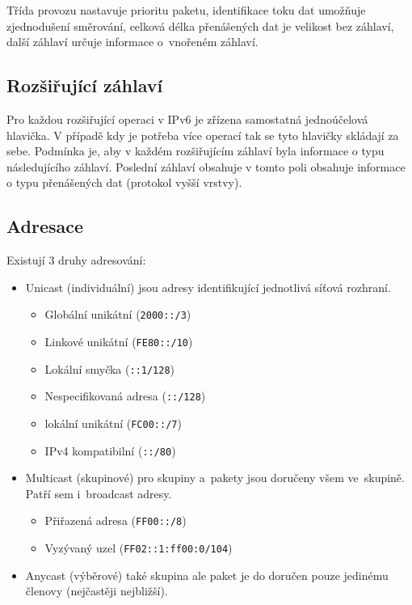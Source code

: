 Třída provozu nastavuje prioritu paketu, identifikace toku dat umožňuje zjednodušení směrování, celková délka přenášených dat je velikost bez záhlaví, další záhlaví určuje informace o~vnořeném záhlaví.

\subsection{Rozšiřující záhlaví}

Pro každou rozšiřující operaci v IPv6 je zřízena samostatná jednoúčelová hlavička.
V případě kdy je potřeba více operací tak se tyto hlavičky skládají za sebe. Podmínka je, aby v každém rozšiřujícím záhlaví byla informace o typu následujícího záhlaví.
Poslední záhlaví obsahuje v tomto poli obsahuje informace o typu přenášených dat (protokol vyšší vrstvy).

\subsection{Adresace}

Existují 3 druhy adresování:
\begin{itemize}[noitemsep]
    \item Unicast (individuální) jsou adresy identifikující jednotlivá síťová rozhraní.
    \begin{itemize}[noitemsep]
        \item Globální unikátní (\texttt{2000::/3})
        \item Linkové unikátní (\texttt{FE80::/10})
        \item Lokální smyčka (\texttt{::1/128})
        \item Nespecifikovaná adresa (\texttt{::/128})
        \item lokální unikátní (\texttt{FC00::/7})
        \item IPv4 kompatibilní (\texttt{::/80})
    \end{itemize}
    \item Multicast (skupinové) pro skupiny a~pakety jsou doručeny všem ve~skupině. Patří sem i~broadcast adresy.
    \begin{itemize}[noitemsep]
        \item Přiřazená adresa (\texttt{FF00::/8})
        \item Vyzývaný uzel (\texttt{FF02::1:ff00:0/104})
    \end{itemize}
    \item Anycast (výběrové) také skupina ale paket je do doručen pouze jedinému členovy (nejčastěji nejbližší).
\end{itemize}

